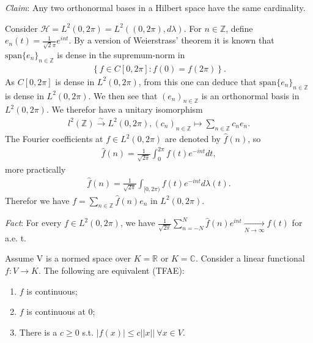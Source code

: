 \emph{Claim}: Any two orthonormal bases in a Hilbert space have the same cardinality.
\begin{example}
    Consider \(\mathcal{H} = L^2(0,2\pi) = L^2((0,2\pi), d\lambda)\). For \(n\in\mathbb{Z}\), define
    \(e_n(t) = \frac{1}{\sqrt{2}\pi}e^{int}\). By a version of Weierstrass' theorem it is known that 
    \(\text{span}\{e_n\}_{n\in\mathbb{Z}}\) is dense in the supremum-norm in 
    \begin{align*}
        \left\{f\in C[0,2\pi]: f(0)=f(2\pi)\right\}.
    \end{align*}
    As \(C[0,2\pi]\) is dense in \(L^2(0,2\pi)\), from this one can deduce that \(\text{span}\{e_n\}_{n\in\mathbb{Z}}\) is dense
    in \(L^2(0,2\pi)\). We then see that \((e_n)_{n\in\mathbb{Z}}\) is an orthonormal basis in \(L^2(0,2\pi)\). We therefor
    have a unitary isomorphism
    \begin{align*}
        l^2(\mathbb{Z}) \xrightarrow[ ]{\sim}L^2(0,2\pi), (c_n)_{n\in\mathbb{Z}} \mapsto \sum\limits_{n\in\mathbb{Z}}c_n e_n.
    \end{align*}
    The Fourier coefficients at \(f\in L^2(0,2\pi)\) are denoted by \(\hat{f}(n)\), so 
    \begin{align*}
        \hat{f}(n) = \frac{1}{\sqrt{2\pi}}\int_{0}^{2\pi} f(t) e^{-int}dt,
    \end{align*}
    more practically
    \begin{align*}
        \hat{f}(n) = \frac{1}{\sqrt{2\pi}}\int_{[0,2\pi)} f(t) e^{-int}d\lambda(t).
    \end{align*}
    Therefor we have \(f=\sum_{n\in\mathbb{Z}} \hat{f}(n)e_n\) in \(L^2(0,2\pi)\).

    \emph{Fact}: For every \(f\in L^2(0,2\pi)\), we have \(\frac{1}{\sqrt{2\pi}} \sum_{n=-N}^{N} \hat{f}(n)e^{int}
    \xrightarrow[N\rightarrow\infty]{ } f(t)\) for a.e. t.
\end{example}
\fi 
\begin{lemma}
    Assume V is a normed space over \(K=\mathbb{R}\) or \(K=\mathbb{C}\). Consider a linear functional \(f:V\rightarrow K\). The following
    are equivalent (TFAE):
    \begin{enumerate}[label=(\roman*)]
        \item \(f\) is continuous;
        \item \(f\) is continuous at 0;
        \item There is a \(c\geq0\) s.t. \(|f(x)|\leq c ||x|| \ \forall x\in V\).
    \end{enumerate}
\end{lemma}

